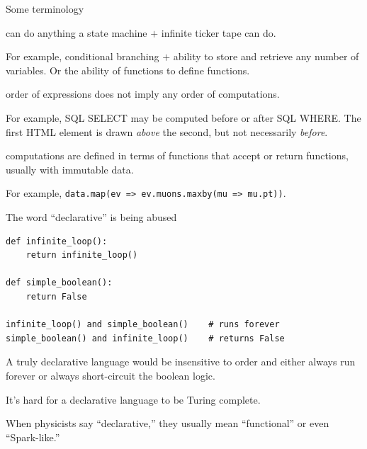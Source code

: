 \documentclass[aspectratio=169]{beamer}
\begin{document}
\begin{frame}{Some terminology}
\large
\vspace{0.5 cm}
\begin{description}\setlength{\itemsep}{0.5 cm}
\item[Turing complete:] can do anything a state machine $+$ infinite ticker tape can do.

\vspace{0.25 cm}
{\normalsize For example, conditional branching $+$ ability to store and retrieve any number of variables. Or the ability of functions to define functions.}

\item[Declarative:] order of expressions does not imply any order of computations.

\vspace{0.25 cm}
{\normalsize For example, SQL SELECT may be computed before or after SQL WHERE. The first HTML element is drawn {\it above} the second, but not necessarily {\it before}.}

\item[Functional:] computations are defined in terms of functions that accept or return functions, usually with immutable data.

\vspace{0.25 cm}
{\normalsize For example, \small\texttt{data.map(ev => ev.muons.maxby(mu => mu.pt))}\normalsize .}
\end{description}
\end{frame}

\begin{frame}[fragile]{The word ``declarative'' is being abused}
\small
\vspace{0.25 cm}
\begin{center}
\begin{minipage}{0.8\linewidth}
\begin{verbatim}
def infinite_loop():
    return infinite_loop()

def simple_boolean():
    return False

infinite_loop() and simple_boolean()    # runs forever
simple_boolean() and infinite_loop()    # returns False
\end{verbatim}
\end{minipage}
\end{center}

\normalsize
\vspace{0.25 cm}
A truly declarative language would be insensitive to order and either always run forever or always short-circuit the boolean logic.

\vspace{0.5 cm}
It's hard for a declarative language to be Turing complete.

\vspace{0.5 cm}
When physicists say ``declarative,'' they usually mean ``functional'' or even ``Spark-like.''
\end{frame}
\end{document}

